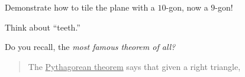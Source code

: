 \documentclass[noauthor,nooutcomes,handout,hints,12pt]{ximera}
\begin{document}
\begin{question}
  Demonstrate how to tile the plane with a $10$-gon, now a $9$-gon!

  \begin{hint}
    Think about ``teeth.''
  \end{hint}  
\end{question}
\mynewpage



\begin{question}
  Do you recall, the \textit{most famous theorem of all?}
    \begin{mdframed}[style=OutcomeStyle]\begin{quote}
    The \underline{Pythagorean theorem} says that given a right
    triangle,
    \begin{center}
\end{center}
\end{quote}
\end{mdframed}
\end{question}
\end{document}
